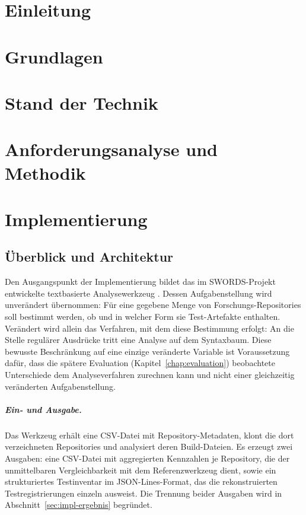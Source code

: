 \documentclass[12pt,a4paper,twoside,headsepline,parskip=half]{scrreprt}
\begin{document}
\tableofcontents


\clearpage
{}

\chapter{Einleitung}
\chapter{Grundlagen}
\chapter{Stand der Technik}
\chapter{Anforderungsanalyse und Methodik}
\chapter{Implementierung}

\section{Überblick und Architektur}
\label{sec:impl-ueberblick}

Den Ausgangspunkt der Implementierung bildet das im SWORDS-Projekt entwickelte
textbasierte Analysewerkzeug \cite{SWORDS_template_UP_2024}. Dessen Aufgabenstellung
wird unverändert übernommen: Für eine gegebene Menge von Forschungs-Repositories soll
bestimmt werden, ob und in welcher Form sie Test-Artefakte enthalten. Verändert wird
allein das Verfahren, mit dem diese Bestimmung erfolgt: An die Stelle regulärer
Ausdrücke tritt eine Analyse auf dem Syntaxbaum. Diese bewusste Beschränkung auf eine
einzige veränderte Variable ist Voraussetzung dafür, dass die spätere Evaluation
(Kapitel~\ref{chap:evaluation}) beobachtete Unterschiede dem Analyseverfahren
zurechnen kann und nicht einer gleichzeitig veränderten Aufgabenstellung.

\paragraph{Ein- und Ausgabe.}
Das Werkzeug erhält eine CSV-Datei mit Repository-Metadaten, klont die dort
verzeichneten Repositories und analysiert deren Build-Dateien. Es erzeugt zwei
Ausgaben: eine CSV-Datei mit aggregierten Kennzahlen je Repository, die der
unmittelbaren Vergleichbarkeit mit dem Referenzwerkzeug dient, sowie ein
strukturiertes Testinventar im JSON-Lines-Format, das die rekonstruierten
Testregistrierungen einzeln ausweist. Die Trennung beider Ausgaben wird in
Abschnitt~\ref{sec:impl-ergebnis} begründet.
\end{document}
